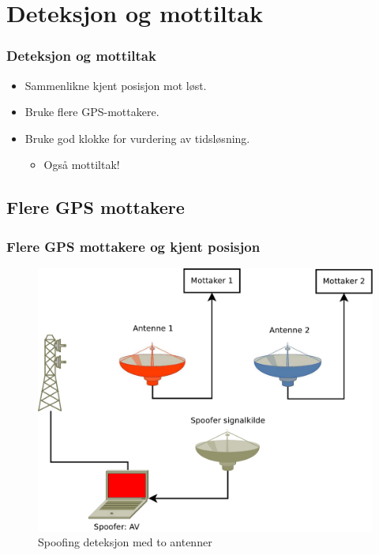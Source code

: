 \documentclass[xcolor=table]{beamer}
\begin{document}

\section{Deteksjon og mottiltak}
\begin{frame}
\frametitle{Deteksjon og mottiltak}
  \begin{itemize}
        \setlength\itemsep{1em}
      \item Sammenlikne kjent posisjon mot løst.
      \item Bruke flere GPS-mottakere.
      \item Bruke god klokke for vurdering av tidsløsning.
        \begin{itemize}
          \item Også mottiltak!
        \end{itemize}
    \end{itemize}
\end{frame}

\subsection{Flere GPS mottakere}
\begin{frame} 
  \frametitle{Flere GPS mottakere og kjent posisjon}
  \begin{figure}
    \includegraphics[scale=0.23]{thesis/graphics/toantenner.pdf}
    \caption{Spoofing deteksjon med to antenner}
  \end{figure}
\end{frame}
\end{document}
